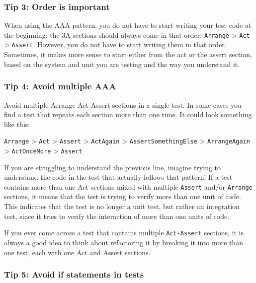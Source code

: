 \documentclass[
]{book}
\begin{document}
\hypertarget{ordering}{%
\subsubsection{Tip 3: Order is important}\label{ordering}}

When using the AAA pattern, you do not have to start writing your test code at the beginning: the 3A sections should always come in that order; \texttt{Arrange} \textgreater{} \texttt{Act} \textgreater{} \texttt{Assert}. However, you do not have to start writing them in that order. Sometimes, it makes more sense to start either from the act or the assert section, based on the system and unit you are testing and the way you understand it.

\hypertarget{multipleaaa}{%
\subsubsection{Tip 4: Avoid multiple AAA}\label{multipleaaa}}

Avoid multiple Arrange-Act-Assert sections in a single test. In some cases you find a test that repeats each section more than one time. It could look something like this:

\texttt{Arrange} \textgreater{} \texttt{Act} \textgreater{} \texttt{Assert} \textgreater{} \texttt{ActAgain} \textgreater{} \texttt{AssertSomethingElse} \textgreater{} \texttt{ArrangeAgain} \textgreater{} \texttt{ActOnceMore} \textgreater{} \texttt{Assert}

If you are struggling to understand the previous line, imagine trying to understand the code in the test that actually follows that pattern! If a test contains more than one Act sections mixed with multiple \texttt{Assert} and/or \texttt{Arrange} sections, it means that the test is trying to verify more than one unit of code. This indicates that the test is no longer a unit test, but rather an integration test, since it tries to verify the interaction of more than one units of code.

If you ever come across a test that contains multiple \texttt{Act-Assert} sections, it is always a good idea to think about refactoring it by breaking it into more than one test, each with one Act and Assert sections.

\hypertarget{avoidif}{%
\subsubsection{Tip 5: Avoid if statements in tests}\label{avoidif}}
\end{document}
